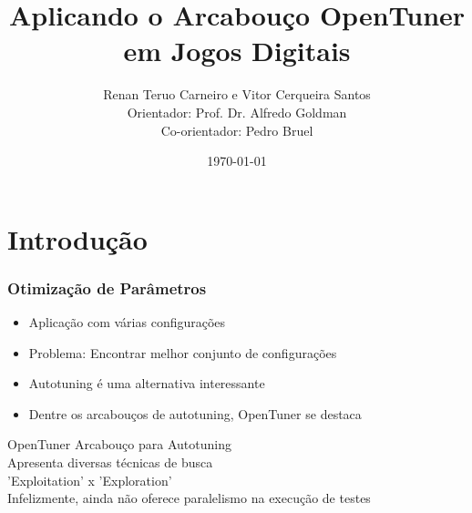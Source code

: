 \documentclass[10pt]{beamer}
\title{Aplicando o Arcabouço OpenTuner em Jogos Digitais}
\date{\today}
\author{Renan Teruo Carneiro e Vitor Cerqueira Santos\\
	Orientador: Prof. Dr. Alfredo Goldman\\
    Co-orientador: Pedro Bruel}
\institute{Instituto de Matemática e Estatística}
\begin{document}
\maketitle


\section{Introdução}

\begin{frame}[fragile]
	\frametitle{Otimização de Parâmetros}
	  \begin{itemize}
	  	\item Aplicação com várias configurações
	  	\item Problema: Encontrar melhor conjunto de configurações
	  	\item Autotuning é uma alternativa interessante
	  	\item Dentre os arcabouços de autotuning, OpenTuner se destaca
	  \end{itemize}
\end{frame}

\begin{frame}{OpenTuner}
	Arcabouço para Autotuning\\
	Apresenta diversas técnicas de busca\\
	'Exploitation' x 'Exploration'\\
	Infelizmente, ainda não oferece paralelismo na execução de testes
\end{frame}
\end{document}
